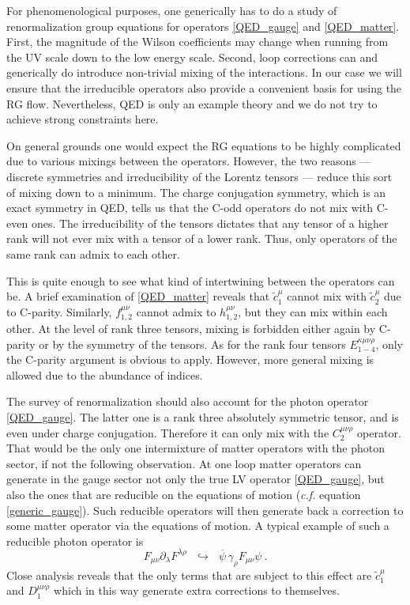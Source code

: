 \documentclass[12pt,preprintnumbers,nofootinbib]{revtex4}
\newcommand{\wt}{\widetilde}
\newcommand{\ov}{\overline}
\begin{document}
	For phenomenological purposes, one generically has to do a study
	of renormalization group equations for operators
	\eqref{QED_gauge} and \eqref{QED_matter}.
	First, the magnitude of the Wilson coefficients may change when
	running from the UV scale down to the low energy scale.
	Second, loop corrections can and generically do introduce
	non-trivial mixing of the interactions.
	In our case we will ensure that the irreducible operators
	also provide a convenient basis for using the RG flow.
	Nevertheless, QED is only an example theory and we do not
	try to achieve strong constraints here. 

	On general grounds one would expect the RG equations to be highly
	complicated due to various mixings between the operators.
	However, the two reasons --- discrete symmetries and irreducibility
	of the Lorentz tensors --- reduce this sort of mixing down to
	a minimum.
	The charge conjugation symmetry, which is an exact symmetry in QED,
	tells us that the C-odd operators do not mix with C-even ones.
	The irreducibility of the tensors dictates that any tensor of
	a higher rank will not ever mix with a tensor of a lower rank.
	Thus, only operators of the same rank can admix to each other.
	
	This is quite enough to see what kind of intertwining between 
	the operators can be.
	A brief examination of \eqref{QED_matter} reveals that
	$ \wt{c}_1^\mu $ cannot mix with $ \wt{c}_2^\mu $ due to C-parity.
	Similarly, $ f_{1,2}^{\mu\nu} $ cannot admix to $ h_{1,2}^{\mu\nu} $,
	but they can mix within each other.
	At the level of rank three tensors, mixing is forbidden either
	again by C-parity or by the symmetry of the tensors. 
	As for the rank four tensors $ E_{1-4}^{\kappa\mu\nu\rho} $,
	only the C-parity argument is obvious to apply.
	However, more general mixing is allowed due to the abundance
	of indices.
		
	The survey of renormalization should also account for the photon
	operator \eqref{QED_gauge}.
	The latter one is a rank three absolutely symmetric tensor, 
	and is even under charge conjugation.  
	Therefore it can only mix with the $ C_2^{\mu\nu\rho} $ operator.
	That would be the only one intermixture of matter operators with
	the photon sector, if not the following observation.
	At one loop matter operators can generate in the gauge sector not 
	only the true LV operator \eqref{QED_gauge}, 
	but also the ones that are reducible on the equations of motion
	({\it c.f.} equation \eqref{generic_gauge}).
	Such reducible operators will then generate back a correction to 
	some matter operator via the equations of motion.
	A typical example of such a reducible photon operator is 
\[
 	F_{\mu\nu} \partial_\lambda F^{\lambda\rho} 
	~~~\hookrightarrow~~~
		\ov{\psi}\, \gamma_\rho F_{\mu\nu} \psi
	~.
\]
	Close analysis reveals that the only terms that are subject
	to this effect are $ \wt{c}_1^\mu $ and $ D_1^{\mu\nu\rho} $
	which in this way generate extra corrections to themselves.
\end{document}
